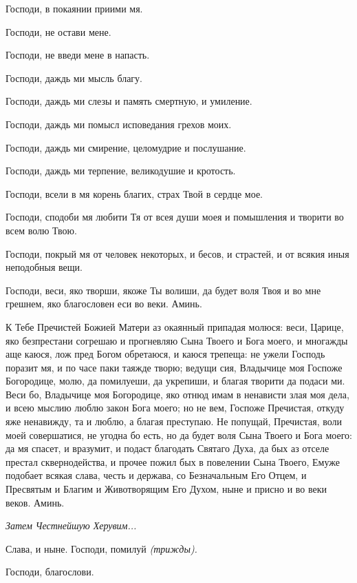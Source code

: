 Господи, в покаянии приими мя.

Господи, не остави мене.

Господи, не введи мене в напасть.

Господи, даждь ми мысль благу.

Господи, даждь ми слезы и память смертную, и умиление.

Господи, даждь ми помысл исповедания грехов моих.

Господи, даждь ми смирение, целомудрие и послушание.

Господи, даждь ми терпение, великодушие и кротость.

Господи, всели в мя корень благих, страх Твой в сердце мое.

Господи, сподоби мя любити Тя от всея души моея и помышления и творити во всем волю Твою.

Господи, покрый мя от человек некоторых, и бесов, и страстей, и от всякия иныя неподобныя вещи.

Господи, веси, яко творши, якоже Ты волиши, да будет воля Твоя и во мне грешнем, яко благословен еси во веки. Аминь.



К Тебе Пречистей Божией Матери аз окаянный припадая молюся: веси, Царице, яко безпрестани согрешаю и прогневляю Сына Твоего и Бога моего, и многажды аще каюся, лож пред Богом обретаюся, и каюся трепеща: не ужели Господь поразит мя, и по часе паки таяжде творю; ведущи сия, Владычице моя Госпоже Богородице, молю, да помилуеши, да укрепиши, и благая творити да подаси ми. Веси бо, Владычице моя Богородице, яко отнюд имам в ненависти злая моя дела, и всею мыслию люблю закон Бога моего; но не вем, Госпоже Пречистая, откуду яже ненавижду, та и люблю, а благая преступаю. Не попущай, Пречистая, воли моей совершатися, не угодна бо есть, но да будет воля Сына Твоего и Бога моего: да мя спасет, и вразумит, и подаст благодать Святаго Духа, да бых аз отселе престал сквернодейства, и прочее пожил бых в повелении Сына Твоего, Емуже подобает всякая слава, честь и держава, со Безначальным Его Отцем, и Пресвятым и Благим и Животворящим Его Духом, ныне и присно и во веки веков. Аминь.


\itshape Затем \normalfont{}Честнейшую Херувим... 

Слава, и ныне. Господи, помилуй \itshape (трижды)\normalfont{}. 

Господи, благослови. 




